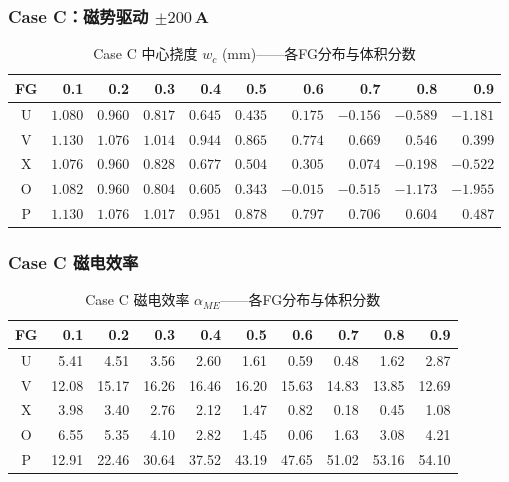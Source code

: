 \documentclass[12pt,a4paper]{ctexart}
\begin{document}
\subsubsection{Case C：磁势驱动 $\pm200$\,A}

\begin{table}[H]
\centering
\caption{Case C 中心挠度 $w_c$ (mm)——各FG分布与体积分数}
\label{tab:magneto-results}
\small
\begin{tabular}{c*{9}{r}}
\toprule
\textbf{FG} & \textbf{0.1} & \textbf{0.2} & \textbf{0.3} & \textbf{0.4} & \textbf{0.5} & \textbf{0.6} & \textbf{0.7} & \textbf{0.8} & \textbf{0.9} \\
\midrule
U & $1.080$ & $0.960$ & $0.817$ & $0.645$ & $0.435$ & $0.175$ & $-0.156$ & $-0.589$ & $-1.181$ \\
V & $1.130$ & $1.076$ & $1.014$ & $0.944$ & $0.865$ & $0.774$ & $0.669$ & $0.546$ & $0.399$ \\
X & $1.076$ & $0.960$ & $0.828$ & $0.677$ & $0.504$ & $0.305$ & $0.074$ & $-0.198$ & $-0.522$ \\
O & $1.082$ & $0.960$ & $0.804$ & $0.605$ & $0.343$ & $-0.015$ & $-0.515$ & $-1.173$ & $-1.955$ \\
P & $1.130$ & $1.076$ & $1.017$ & $0.951$ & $0.878$ & $0.797$ & $0.706$ & $0.604$ & $0.487$ \\
\bottomrule
\end{tabular}
\end{table}

\subsubsection{Case C 磁电效率}

\begin{table}[H]
\centering
\caption{Case C 磁电效率 $\alpha_{ME}$——各FG分布与体积分数}
\label{tab:me-efficiency}
\small
\begin{tabular}{c*{9}{r}}
\toprule
\textbf{FG} & \textbf{0.1} & \textbf{0.2} & \textbf{0.3} & \textbf{0.4} & \textbf{0.5} & \textbf{0.6} & \textbf{0.7} & \textbf{0.8} & \textbf{0.9} \\
\midrule
U & 5.41 & 4.51 & 3.56 & 2.60 & 1.61 & 0.59 & 0.48 & 1.62 & 2.87 \\
V & 12.08 & 15.17 & 16.26 & 16.46 & 16.20 & 15.63 & 14.83 & 13.85 & 12.69 \\
X & 3.98 & 3.40 & 2.76 & 2.12 & 1.47 & 0.82 & 0.18 & 0.45 & 1.08 \\
O & 6.55 & 5.35 & 4.10 & 2.82 & 1.45 & 0.06 & 1.63 & 3.08 & 4.21 \\
P & 12.91 & 22.46 & 30.64 & 37.52 & 43.19 & 47.65 & 51.02 & 53.16 & 54.10 \\
\bottomrule
\end{tabular}
\end{table}
\end{document}
